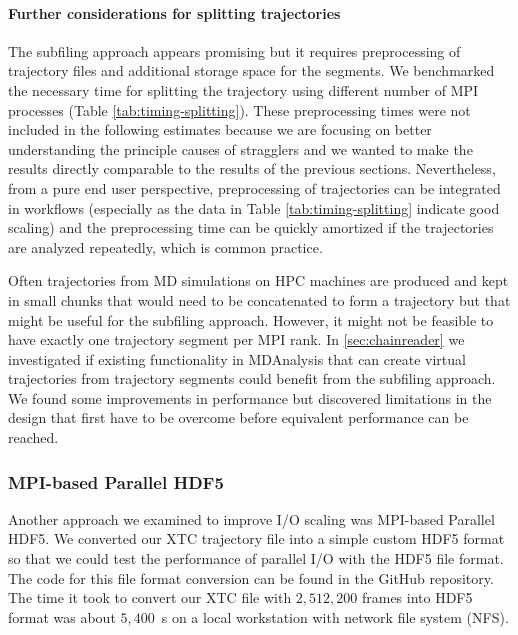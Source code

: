 \paragraph{Further considerations for splitting trajectories}
The subfiling approach appears promising but it requires preprocessing of trajectory files and additional storage space for the segments.
We benchmarked the necessary time for splitting the trajectory using different number of MPI processes (Table \ref{tab:timing-splitting}).
These preprocessing times were not included in the following estimates because we are focusing on better understanding the principle causes of stragglers and we wanted to make the results directly comparable to the results of the previous sections.
Nevertheless, from a pure end user perspective, preprocessing of trajectories can be integrated in workflows (especially as the data in Table \ref{tab:timing-splitting} indicate good scaling) and the preprocessing time can be quickly amortized if the trajectories are analyzed repeatedly, which is common practice.

Often trajectories from MD simulations on HPC machines are produced and kept in small chunks that would need to be concatenated to form a trajectory but that might be useful for the subfiling approach.
However, it might not be feasible to have exactly one trajectory segment per MPI rank.
In \ref{sec:chainreader} we investigated if existing functionality in MDAnalysis that can create virtual trajectories from trajectory segments could benefit from the subfiling approach.
We found some improvements in performance but discovered limitations in the design that first have to be overcome before equivalent performance can be reached.
 
\subsubsection{MPI-based Parallel HDF5}
\label{HDF5}
Another approach we examined to improve I/O scaling was MPI-based Parallel HDF5. 
We converted our XTC trajectory file into a simple custom HDF5 format so that we could test the performance of parallel I/O with the HDF5 file format.
The code for this file format conversion can be found in the GitHub repository.
The time it took to convert our XTC file with $2,512,200$ frames into HDF5 format was about $5,400$~s on a local workstation with network file system (NFS).

